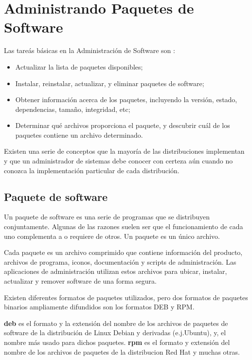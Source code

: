 \documentclass[12pt]{article}
\begin{document}
\section*{Administrando Paquetes de Software}

Las tareás básicas en la Administración de Software son :
\begin{itemize}
\item Actualizar la lista de paquetes disponibles;
\item Instalar, reinstalar, actualizar, y eliminar paquetes de software;
\item Obtener información acerca de los paquetes, incluyendo la versión, estado, dependencias, tamaño, integridad, etc;
\item Determinar qué archivos proporciona el paquete, y descubrir cuál de los paquetes contiene un archivo determinado.
\end{itemize}

Existen una serie de conceptos que la 
mayoría de las distribuciones implementan y que un administrador de 
sistemas debe conocer con certeza aún cuando no conozca la implementación
particular de cada distribución.  


\subsection*{Paquete de software}


Un paquete de software es una serie de programas que se distribuyen conjuntamente. Algunas de las razones suelen ser que el funcionamiento de cada uno complementa a o requiere de otros. Un paquete es un único archivo.


Cada paquete es un archivo comprimido que contiene información del producto, archivos de programa, iconos, documentación y scripts de administración. Las aplicaciones de administración utilizan estos archivos para ubicar, instalar, actualizar y remover software de una forma segura. 

Existen diferentes formatos de paquetes utilizados, pero 
dos formatos de paquetes binarios ampliamente difundidos son los formatos DEB y RPM.

{\bf deb} es el formato y la extensión del nombre de los archivos de paquetes de software de la distribución de Linux Debian y derivadas (e.j.Ubuntu), y, el nombre más usado para dichos paquetes. 
{\bf rpm} es el formato y extensión del nombre de los archivos de paquetes de la distribucion Red Hat y muchas otras.
\end{document}

